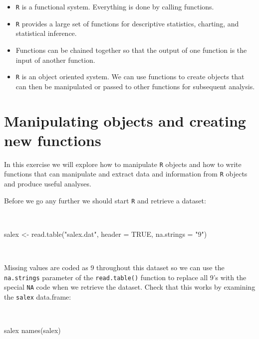 \documentclass[
  12pt,
  a4paper]{book}
\newenvironment{Shaded}{\begin{snugshade}}{\end{snugshade}}
\newcommand{\AttributeTok}[1]{\textcolor[rgb]{0.77,0.63,0.00}{#1}}
\newcommand{\ConstantTok}[1]{\textcolor[rgb]{0.00,0.00,0.00}{#1}}
\newcommand{\FunctionTok}[1]{\textcolor[rgb]{0.00,0.00,0.00}{#1}}
\newcommand{\NormalTok}[1]{#1}
\newcommand{\OtherTok}[1]{\textcolor[rgb]{0.56,0.35,0.01}{#1}}
\newcommand{\StringTok}[1]{\textcolor[rgb]{0.31,0.60,0.02}{#1}}
\providecommand{\tightlist}{%
  \setlength{\itemsep}{0pt}\setlength{\parskip}{0pt}}
\begin{document}
\begin{itemize}
\tightlist
\item
  \texttt{R} is a functional system. Everything is done by calling functions.
\item
  \texttt{R} provides a large set of functions for descriptive statistics, charting, and statistical inference.
\item
  Functions can be chained together so that the output of one function is the input of another function.
\item
  \texttt{R} is an object oriented system. We can use functions to create objects that can then be manipulated or passed to other functions for subsequent analysis.
\end{itemize}

\hypertarget{exercise2}{%
\chapter{Manipulating objects and creating new functions}\label{exercise2}}

In this exercise we will explore how to manipulate \texttt{R} objects and how to write functions that can manipulate and extract data and information from \texttt{R} objects and produce useful analyses.

Before we go any further we should start \texttt{R} and retrieve a dataset:

~

\begin{Shaded}
\begin{Highlighting}[]
\NormalTok{salex }\OtherTok{\textless{}{-}} \FunctionTok{read.table}\NormalTok{(}\StringTok{"salex.dat"}\NormalTok{, }\AttributeTok{header =} \ConstantTok{TRUE}\NormalTok{, }\AttributeTok{na.strings =} \StringTok{"9"}\NormalTok{)}
\end{Highlighting}
\end{Shaded}

~

Missing values are coded as 9 throughout this dataset so we can use the \texttt{na.strings} parameter of the \texttt{read.table()} function to replace all 9's with the special \texttt{NA} code when we retrieve the dataset. Check that this works by examining the \texttt{salex} data.frame:

~

\begin{Shaded}
\begin{Highlighting}[]
\NormalTok{salex}
\FunctionTok{names}\NormalTok{(salex)}
\end{Highlighting}
\end{Shaded}
\end{document}
